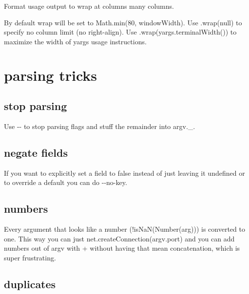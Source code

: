 Format usage output to wrap at {\ttfamily columns} many columns.

By default wrap will be set to {\ttfamily Math.\+min(80, window\+Width)}. Use {\ttfamily .wrap(null)} to specify no column limit (no right-\/align). Use {\ttfamily .wrap(yargs.\+terminal\+Width())} to maximize the width of yargs\textquotesingle{} usage instructions.

\section*{parsing tricks }

\subsection*{stop parsing }

Use {\ttfamily -\/-\/} to stop parsing flags and stuff the remainder into {\ttfamily argv.\+\_\+}. 


\subsection*{negate fields }

If you want to explicitly set a field to false instead of just leaving it undefined or to override a default you can do {\ttfamily -\/-\/no-\/key}. 


\subsection*{numbers }

Every argument that looks like a number ({\ttfamily !is\+NaN(Number(arg))}) is converted to one. This way you can just {\ttfamily net.\+create\+Connection(argv.\+port)} and you can add numbers out of {\ttfamily argv} with {\ttfamily +} without having that mean concatenation, which is super frustrating.

\subsection*{duplicates }

